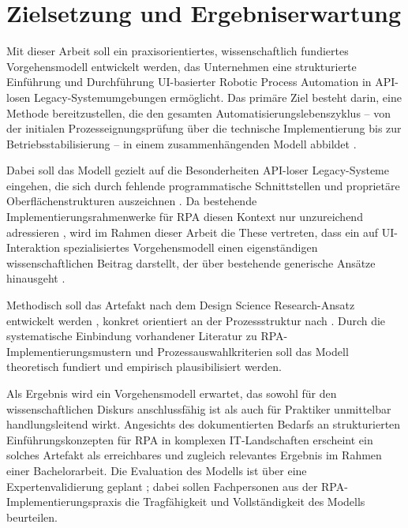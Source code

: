 \newpage
\section{Zielsetzung und Ergebniserwartung}

Mit dieser Arbeit soll ein praxisorientiertes, wissenschaftlich fundiertes Vorgehensmodell
entwickelt werden, das Unternehmen eine strukturierte Einführung und Durchführung
\acs{UI}-basierter Robotic Process Automation in \acs{API}-losen Legacy-Systemumgebungen ermöglicht.
Das primäre Ziel besteht darin, eine Methode bereitzustellen, die den gesamten
Automatisierungslebenszyklus -- von der initialen Prozesseignungsprüfung über die
technische Implementierung bis zur Betriebsstabilisierung -- in einem zusammenhängenden
Modell abbildet \autocite[Vgl.][S.~405]{SantosPereira2020}.
 
Dabei soll das Modell gezielt auf die Besonderheiten \acs{API}-loser Legacy-Systeme eingehen,
die sich durch fehlende programmatische Schnittstellen und proprietäre Oberflächenstrukturen
auszeichnen \autocite[Vgl.][S.~103]{Bisbal1999}. Da bestehende Implementierungsrahmenwerke für \ac{RPA} diesen
Kontext nur unzureichend adressieren \autocite[Vgl.][S.~3]{HermJaniesch2022}, wird im Rahmen dieser Arbeit
die These vertreten, dass ein auf \acs{UI}-Interaktion spezialisiertes Vorgehensmodell einen
eigenständigen wissenschaftlichen Beitrag darstellt, der über bestehende generische
Ansätze hinausgeht \autocite[Vgl.][S.~5]{KrakauFeldmann2023}.
 
Methodisch soll das Artefakt nach dem Design Science Research-Ansatz entwickelt
werden \autocite[Vgl.][S.~75]{Hevner2004}, konkret orientiert an der Prozessstruktur nach
\textcite{Peffers2007}. Durch die systematische Einbindung vorhandener Literatur zu
\acs{RPA}-Implementierungsmustern \autocite[Vgl.][S.~405]{SantosPereira2020} und
Prozessauswahlkriterien \autocite[Vgl.][S.~1150]{EggertMoulen2020} soll das Modell theoretisch fundiert
und empirisch plausibilisiert werden.
 
Als Ergebnis wird ein Vorgehensmodell erwartet, das sowohl für den wissenschaftlichen
Diskurs anschlussfähig ist als auch für Praktiker unmittelbar handlungsleitend wirkt.
Angesichts des dokumentierten Bedarfs an strukturierten Einführungskonzepten für \ac{RPA}
in komplexen IT-Landschaften \autocite[Vgl.][S.~1]{Lindgren2026} erscheint ein solches Artefakt als
erreichbares und zugleich relevantes Ergebnis im Rahmen einer Bachelorarbeit. Die
Evaluation des Modells ist über eine Expertenvalidierung geplant \autocite[Vgl.][S.~77]{VenableEtAl2016};
dabei sollen Fachpersonen aus der \acs{RPA}-Implementierungspraxis die Tragfähigkeit und
Vollständigkeit des Modells beurteilen.


